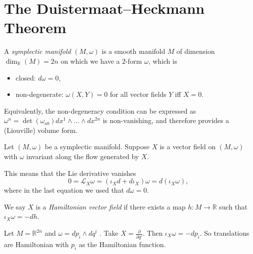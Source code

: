 
\section{The Duistermaat--Heckmann Theorem}%
\label{sec:the_duistermaat_heckmann_theorem}

\begin{definition}
  A \emph{symplectic manifold} $(M, \omega)$ is a smooth manifold $M$ of dimension $\dim_{\mathbb{R}}(M) = 2n$ on which we have a $2$-form $\omega$, which is
  \begin{itemize}
    \item closed: $d\omega = 0$,
    \item non-degenerate: $\omega(X, Y) = 0$ for all vector fields $Y$ iff $X = 0$.
  \end{itemize}
\end{definition}
Equivalently, the non-degeneracy condition can be expressed as $\omega^n = \det(\omega_{ab}) dx^1 \wedge \dots \wedge dx^{2n}$ is non-vanishing, and therefore provides a (Liouville) volume form.

Let $(M, \omega)$ be a symplectic manifold.
Suppose $X$ is a vector field on $(M, \omega)$  with $\omega$  invariant along the flow generated by $X$.
 \begin{figure}[tbhp]
  \centering
  \def\svgwidth{0.3\columnwidth}
  
  \caption{}
  \label{fig:l4f1}
\end{figure}
This means that the Lie derivative vanishes
\begin{equation}
  0 = \mathcal{L}_X \omega = \left( \iota_X d + d \iota_X \right) \omega = d(\iota_X \omega),
\end{equation}
where in the last equation we used that $d\omega = 0$.

\begin{definition}[Hamiltonian]
  \label{def:hamvec}
  We say $X$ is a \emph{Hamiltonian vector field} if there exists a map $h \colon M \to \mathbb{R}$ such that $\iota_X \omega = - dh$.
\end{definition}
\begin{example}[]
  Let $M = \mathbb{R}^{2n}$  and $\omega = dp_i \wedge dq^{i}$ . Take $X = \frac{\partial}{\partial q^{i}}$. Then $\iota_X \omega = - dp_i$.
  So translations are Hamiltonian with $p_{i}$ as the Hamiltonian function.
\end{example}

